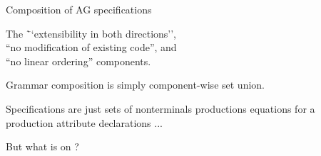 \documentclass[notes,11pt,aspectratio=169]{beamer}
\begin{document}
\begin{frame}[t]{Composition of AG specifications}
\begin{tabbing}
The \=``extensibility in both directions'', \\
    \>``no modification of existing code'', and \\
    \>``no linear ordering'' components.
\end{tabbing}

\bigskip
Grammar composition is simply component-wise set union.

\bigskip
Specifications are just sets of
\bi
 \x nonterminals
 \x productions
 \x equations for a production
 \x attribute declarations
 \x ...
\ei

\pause

\bigskip
But what is  on  ?
\end{frame}





\newcommand{\rtne}[3]{
\draw ($(#1,#2*\ys)$) node{#3};
\ppe{#1}{#2}
\vale{#1}{#2}
\erre{#1}{#2}

\draw[gray] ($(#1+1.1,\ys*#2+0.25)$) --
            ($(#1-0.3,\ys*#2+0.25)$) arc (90:270:4.5mm);

\draw[gray] ($(#1+1.1,\ys*#2+0.25)$) arc (90:-90:4.5mm) -- 
            ($(#1-0.3,\ys*#2-0.65)$) ;
}

\newcommand{\tne}[3]{
\rtne{#1}{#2}{#3}
\enve{#1}{#2}
}

\newcommand{\ppevalimplies}{
\pause\ppc{6.5}{2} %

\ppc{5.25}{1} %
\ppc{7.75}{1}%


}
\newcommand{\erroreval}{



\pause\errd{11.5}{2} %
\pause\errd{10.25}{1} %
\pause\errd{10.25}{0} %

\pause\errc{10.25}{0} %
\pause\errc{10.25}{1} %

\pause\errd{12.75}{1} %
\pause\envd{12.75}{1} %
\pause\envd{11.5}{2} %

\pause\envd{6.5}{2} %
\pause\envc{6.5}{2} %

\pause\envc{11.5}{2} %

\pause\envc{12.75}{1} %
\pause\errc{12.75}{1} %

\pause\errc{11.5}{2} %

\pause\errc{6.5}{2} %

}
\end{document}
